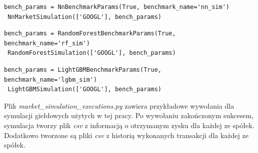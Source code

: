 \documentclass[a4paper, twoside, 11pt, openright]{article}
\begin{document}
\begin{lstlisting}[caption={Przykładowe wywołanie symulacji giełdy dla modelu sieci neuronowej (plik \textit{market\_simulation.py})}, label={code:mlpsim},frame=single, captionpos=b, mathescape=true]
 bench_params = NnBenchmarkParams(True, benchmark_name='nn_sim')
 NnMarketSimulation(['GOOGL'], bench_params)
\end{lstlisting}

\begin{lstlisting}[caption={Przykładowe wywołanie symulacji giełdy dla modelu lasu losowego (plik \textit{market\_simulation.py})}, label={code:rfsim},frame=single, captionpos=b, mathescape=true]
 bench_params = RandomForestBenchmarkParams(True, benchmark_name='rf_sim')
 RandomForestSimulation(['GOOGL'], bench_params)
\end{lstlisting}

\begin{lstlisting}[caption={Przykładowe wywołanie symulacji giełdy dla modelu \textit{Light GBM} (plik \textit{market\_simulation.py})}, label={code:lgbmsim},frame=single, captionpos=b, mathescape=true]
 bench_params = LightGBMBenchmarkParams(True, benchmark_name='lgbm_sim')
 LightGBMSimulation(['GOOGL'], bench_params)
\end{lstlisting}

Plik \textit{market\_simulation\_executions.py} zawiera przykładowe wywołania dla symulacji giełdowych użytych w tej pracy. Po wywołaniu zakończonym sukcesem, symulacja tworzy plik \textit{csv} z informacją o otrzymanym zysku dla każdej ze spółek. Dodatkowo tworzone są pliki \textit{csv} z historią wykonanych transakcji dla każdej ze spółek.
\end{document}
